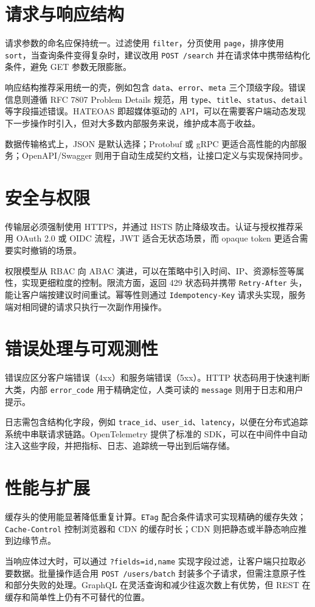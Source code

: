 \chapter{请求与响应结构}
请求参数的命名应保持统一。过滤使用 \texttt{filter}，分页使用 \texttt{page}，排序使用 \texttt{sort}，当查询条件变得复杂时，建议改用 \texttt{POST /search} 并在请求体中携带结构化条件，避免 GET 参数无限膨胀。\par
响应结构推荐采用统一的壳，例如包含 \texttt{data}、\texttt{error}、\texttt{meta} 三个顶级字段。错误信息则遵循 RFC 7807 Problem Details 规范，用 \texttt{type}、\texttt{title}、\texttt{status}、\texttt{detail} 等字段描述错误。HATEOAS 即超媒体驱动的 API，可以在需要客户端动态发现下一步操作时引入，但对大多数内部服务来说，维护成本高于收益。\par
数据传输格式上，JSON 是默认选择；Protobuf 或 gRPC 更适合高性能的内部服务；OpenAPI/Swagger 则用于自动生成契约文档，让接口定义与实现保持同步。\par
\chapter{安全与权限}
传输层必须强制使用 HTTPS，并通过 HSTS 防止降级攻击。认证与授权推荐采用 OAuth 2.0 或 OIDC 流程，JWT 适合无状态场景，而 opaque token 更适合需要实时撤销的场景。\par
权限模型从 RBAC 向 ABAC 演进，可以在策略中引入时间、IP、资源标签等属性，实现更细粒度的控制。限流方面，返回 429 状态码并携带 \texttt{Retry-After} 头，能让客户端按建议时间重试。幂等性则通过 \texttt{Idempotency-Key} 请求头实现，服务端对相同键的请求只执行一次副作用操作。\par
\chapter{错误处理与可观测性}
错误应区分客户端错误（4xx）和服务端错误（5xx）。HTTP 状态码用于快速判断大类，内部 \texttt{error\_{}code} 用于精确定位，人类可读的 \texttt{message} 则用于日志和用户提示。\par
日志需包含结构化字段，例如 \texttt{trace\_{}id}、\texttt{user\_{}id}、\texttt{latency}，以便在分布式追踪系统中串联请求链路。OpenTelemetry 提供了标准的 SDK，可以在中间件中自动注入这些字段，并把指标、日志、追踪统一导出到后端存储。\par
\chapter{性能与扩展}
缓存头的使用能显著降低重复计算。\texttt{ETag} 配合条件请求可实现精确的缓存失效；\texttt{Cache-Control} 控制浏览器和 CDN 的缓存时长；CDN 则把静态或半静态响应推到边缘节点。\par
当响应体过大时，可以通过 \texttt{?fields=id,name} 实现字段过滤，让客户端只拉取必要数据。批量操作适合用 \texttt{POST /users/batch} 封装多个子请求，但需注意原子性和部分失败的处理。GraphQL 在灵活查询和减少往返次数上有优势，但 REST 在缓存和简单性上仍有不可替代的位置。\par
